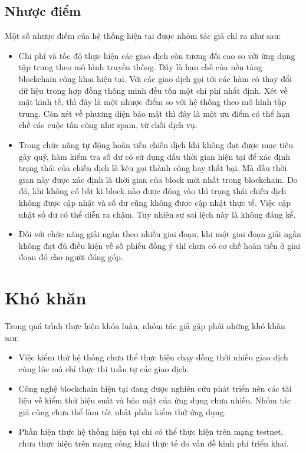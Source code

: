 \documentclass[../main-report.tex]{subfiles}
\begin{document}
\subsection{Nhược điểm}
Một số nhược điểm của hệ thống hiện tại được nhóm tác giả chỉ ra như sau:

\begin{itemize}
\item Chi phí và tốc độ thực hiện các giao dịch còn tương đối cao so với ứng dụng tập trung theo mô hình truyền thống. Đây là hạn chế của nền tảng blockchain công khai hiện tại. Với các giao dịch gọi tới các hàm có thay đổi dữ liệu trong hợp đồng thông minh đều tốn một chi phí nhất định. Xét về mặt kinh tế, thì đây là một nhược điểm so với hệ thống theo mô hình tập trung. Còn xét về phương diện bảo mật thì đây là một ưu điểm có thể hạn chế các cuộc tấn công như spam, từ chối dịch vụ.
\item Trong chức năng tự động hoàn tiền chiến dịch khi không đạt được mục tiêu gây quỹ, hàm kiểm tra số dư có sử dụng dấu thời gian hiện tại để xác định trạng thái của chiến dịch là kêu gọi thành công hay thất bại. Mà dấu thời gian này được xác định là thời gian của block mới nhất trong blockchain. Do đó, khi không có bất kì block nào được đóng vào thì trạng thái chiến dịch không được cập nhật và số dư cũng không được cập nhật thực tế. Việc cập nhật số dư có thể diễn ra chậm. Tuy nhiên sự sai lệch này là không đáng kể.
\item Đối với chức năng giải ngân theo nhiều giai đoạn, khi một giai đoạn giải ngân không đạt đủ điều kiện về số phiếu đồng ý thì chưa có cơ chế hoàn tiền ở giai đoạn đó cho người đóng góp.
\end{itemize}

\section{Khó khăn}
Trong quá trình thực hiện khóa luận, nhóm tác giả gặp phải những khó khăn sau:

\begin{itemize}
\item Việc kiểm thử hệ thống chưa thể thực hiện chạy đồng thời nhiều giao dịch cùng lúc mà chỉ thực thi tuần tự các giao dịch.
\item Công nghệ blockchain hiện tại đang được nghiên cứu phát triển nên các tài liệu về kiểm thử hiệu suất và bảo mật của ứng dụng chưa nhiều. Nhóm tác giả cũng chưa thể làm tốt nhất phần kiểm thử ứng dụng.
\item Phần hiện thực hệ thống hiện tại chỉ có thể thực hiện trên mạng testnet, chưa thực hiện trên mạng công khai thực tế do vấn đề kinh phí triển khai.
\end{itemize}
\end{document}
